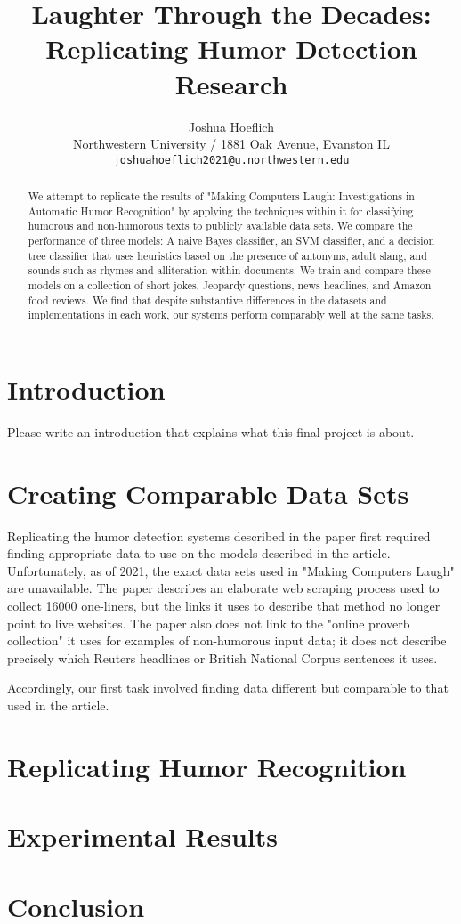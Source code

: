 \documentclass[11pt,a4paper]{article}
\title{Laughter Through the Decades: Replicating Humor Detection Research}
\author{Joshua Hoeflich \\
  Northwestern University / 1881 Oak Avenue, Evanston IL \\
  \texttt{joshuahoeflich2021@u.northwestern.edu} \\
  }
\date{}
\begin{document}
\maketitle
\begin{abstract}
We attempt to replicate the results of "Making Computers Laugh: Investigations in Automatic Humor Recognition" by applying the techniques within it for classifying humorous and non-humorous texts to publicly available data sets. We compare the performance of three models: A naive Bayes classifier, an SVM classifier, and a decision tree classifier that uses heuristics based on the presence of antonyms, adult slang, and sounds such as rhymes and alliteration within documents. We train and compare these models on a collection of short jokes, Jeopardy questions, news headlines, and Amazon food reviews. We find that despite substantive differences in the datasets and implementations in each work, our systems perform comparably well at the same tasks.
\end{abstract}

\section{Introduction}
Please write an introduction that explains what this final project is about.

\section{Creating Comparable Data Sets}
Replicating the humor detection systems described in the paper first required finding appropriate data to use on the models described in the article. Unfortunately, as of 2021, the exact data sets used in "Making Computers Laugh" are unavailable. The paper describes an elaborate web scraping process used to collect 16000 one-liners, but the links it uses to describe that method no longer point to live websites. The paper also does not link to the "online proverb collection" it uses for examples of non-humorous input data; it does not describe precisely which Reuters headlines or British National Corpus sentences it uses.

Accordingly, our first task involved finding data different but comparable to that used in the article.

\section{Replicating Humor Recognition}

\section{Experimental Results}

\section{Conclusion}
\end{document}
